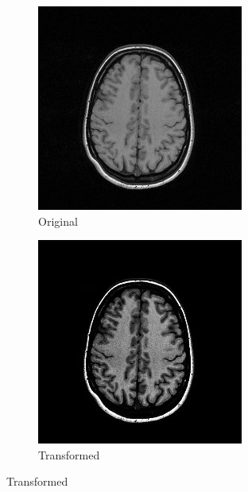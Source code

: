 \documentclass[a4paper]{article}
\begin{document}
\begin{figure}
  \centering
    \begin{subfigure}[b]{0.4\textwidth}
        \centering
        \includegraphics[width=\textwidth]{IRM072_2.jpg}
        \caption{Original}
        \label{fig:sub1}
    \end{subfigure}
    \begin{subfigure}[b]{0.4\textwidth}
        \centering
        \includegraphics[width=\textwidth]{IRM072_tran.jpg}
        \caption{Transformed}
        \label{fig:sub2}
    \end{subfigure}
\end{figure}
\end{document}
